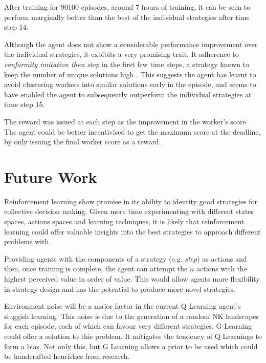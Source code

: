\documentclass[conference]{IEEEtran}
\begin{document}
After training for 90100 episodes, around 7 hours of training,
it can be seen to perform marginally better
than the best of the individual strategies after time step 14.

Although the agent does not show a considerable performance improvement
over the individual strategies,
it exbibits a very promising trait.
It adherence to \emph{conformity imitation then step}
in the first few time steps,
a strategy known to keep the number of unique solutions
high \cite{sociallearning}.
This suggests the agent has learnt to avoid
clustering workers into similar solutions early in the episode,
and seems to have enabled the agent to subsequently outperform
the individual strategies at time step 15.

The reward was issued at each step as the improvement in the worker's score.
The agent could be better incentivised to get the maximum score at the deadline,
by only issuing the final worker score as a reward.


\section{Future Work}
Reinforcement learning show promise
in its ability to identity good strategies for collective decision making.
Given more time experimenting with different
states spaces, actions spaces and learning techniques,
it is likely that reinforcement learning could offer valuable insights
into the best strategies to approach different problems with.

Providing agents with the components of a strategy (e.g. \emph{step}) as actions
and then, once training is complete, the agent can attempt the $n$ actions
with the highest perceived value in order of value.
This would allow agents more flexibility in strategy design
and has the potential to produce more novel strategies.

Environment noise will be a major factor in
the current Q Learning agent's sluggish learning.
This noise is due to the generation of a random NK landscapes for each episode,
each of which can favour very different strategies.
G Learning \cite{glearning}
could offer a solution to this problem.
It mitigates the tendency of Q Learnings to form a bias.
Not only this, but G Learning allows a prior to be used
which could be handcrafted heuristics from research.


{}

\end{document}
